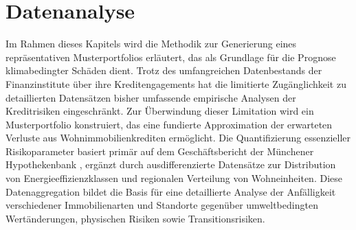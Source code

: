 \section{Datenanalyse}\label{sec:createportfolio}

Im Rahmen dieses Kapitels wird die Methodik zur Generierung eines repräsentativen Musterportfolios erläutert, das als Grundlage für die Prognose klimabedingter Schäden dient. Trotz des umfangreichen Datenbestands der Finanzinstitute über ihre Kreditengagements hat die limitierte Zugänglichkeit zu detaillierten Datensätzen bisher umfassende empirische Analysen der Kreditrisiken eingeschränkt. Zur Überwindung dieser Limitation wird ein Musterportfolio konstruiert, das eine fundierte Approximation der erwarteten Verluste aus Wohnimmobilienkrediten ermöglicht. Die Quantifizierung essenzieller Risikoparameter basiert primär auf dem Geschäftsbericht der Münchener Hypothekenbank \parencite{MuenchenerHyp2023}, ergänzt durch ausdifferenzierte Datensätze zur Distribution von Energieeffizienzklassen und regionalen Verteilung von Wohneinheiten. Diese Datenaggregation bildet die Basis für eine detaillierte Analyse der Anfälligkeit verschiedener Immobilienarten und Standorte gegenüber umweltbedingten Wertänderungen, physischen Risiken sowie Transitionsrisiken. 







